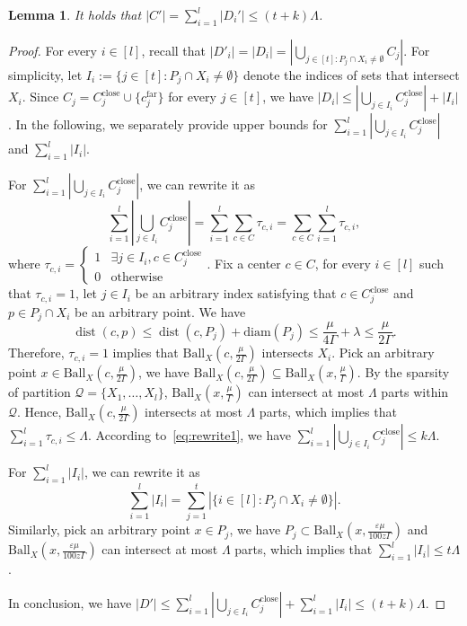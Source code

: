 \documentclass[letterpaper,11pt]{article}
\theoremstyle{plain}
\newtheorem{lemma}[theorem]{Lemma}
\theoremstyle{definition}
\theoremstyle{remark}
\DeclareMathOperator{\dist}{dist}
\newcommand{\diam}{\mathrm{diam}}
\newcommand{\far}{\mathrm{far}}
\newcommand{\close}{\mathrm{close}}
\newcommand{\eps}{\varepsilon}
\newcommand{\calQ}{\mathcal{Q}}
\newcommand{\ball}{\mathrm{Ball}}
\begin{document}
\begin{lemma}
\label{claim:bounded C'}
It holds that
$|C'|=\sum_{i=1}^l |D_i'|\le (t+k)\Lambda$.
\end{lemma}
\begin{proof}

For every $i\in [l]$, recall that $|D'_i|=|D_i|=|\bigcup_{j\in [t]:P_j\cap X_i\neq\emptyset} C_j|$. For simplicity, let $I_i:=\{j\in [t]: P_j\cap X_i\neq\emptyset\}$ denote the indices of sets that intersect $X_i$. Since $C_j = C_j^\close\cup\{c_j^\far\}$ for every $j\in[t]$, we have $|D_i| \le |\bigcup_{j\in I_i} C_j^\close| + |I_i|$. In the following, we separately provide upper bounds for $\sum_{i=1}^l |\bigcup_{j\in I_i} C_j^\close |$ and $\sum_{i=1}^l |I_i|$.

For $\sum_{i=1}^l |\bigcup_{j\in I_i} C_j^\close |$, we can rewrite it as 
\begin{equation}
\label{eq:rewrite1}
\sum_{i=1}^l |\bigcup_{j\in I_i} C_j^\close| = \sum_{i=1}^l\sum_{c\in C} \tau_{c,i} = \sum_{c\in C} \sum_{i=1}^l \tau_{c,i},
\end{equation}
where $\tau_{c,i}=\begin{cases}
1&\exists j\in I_i, c\in C_j^\close\\
0&\text{otherwise}
\end{cases}$.
Fix a center $c\in C$, for every $i\in [l]$ such that $\tau_{c,i} = 1$, let $j\in I_i$ be an arbitrary index satisfying that $c\in C_j^\close$ and $p\in P_j\cap X_i$ be an arbitrary point. We have 
\begin{equation}
\dist(c,p)\le \dist(c,P_j) + \diam(P_j)\le \frac{\mu}{4\Gamma} + \lambda\le \frac{\mu}{2\Gamma}.
\end{equation}
Therefore, $\tau_{c,i} = 1$ implies that $\ball_X(c,\frac{\mu}{2\Gamma})$ intersects $X_i$. Pick an arbitrary point $x\in \ball_X(c,\frac{\mu}{2\Gamma})$, we have $\ball_X(c,\frac{\mu}{2\Gamma})\subseteq \ball_X(x, \frac{\mu}{\Gamma})$.
By the sparsity of partition $\calQ=\{X_1,\dots,X_l\}$, 
$\ball_X(x,\frac{\mu}{\Gamma})$ can intersect at most $\Lambda$ parts within $\calQ$. Hence, $\ball_X(c,\frac{\mu}{2\Gamma})$ intersects at most $\Lambda$ parts, which implies that $\sum_{i=1}^l\tau_{c,i}\le \Lambda$. According to~\eqref{eq:rewrite1}, we have $\sum_{i=1}^l |\bigcup_{j\in I_i} C_j^\close |\le k\Lambda$.

For $\sum_{i=1}^l|I_i|$, we can rewrite it as 
\begin{equation}
\sum_{i=1}^l|I_i| = \sum_{j=1}^t |\{i\in [l]: P_j\cap X_i\neq\emptyset\}|.
\end{equation}
Similarly, pick an arbitrary point $x\in P_j$, we have
$P_j\subset \ball_X(x,\frac{\eps\mu}{100z\Gamma})$ and $\ball_X(x,\frac{\eps\mu}{100z\Gamma})$ can intersect at most $\Lambda$ parts, which implies that $\sum_{i=1}^l|I_i|\le t\Lambda$.

In conclusion, we have $|D'|\le \sum_{i=1}^l|\bigcup_{j\in I_i}C_j^\close | + \sum_{i=1}^l |I_i| \le (t+k)\Lambda$.
\end{proof}
 
\end{document}
